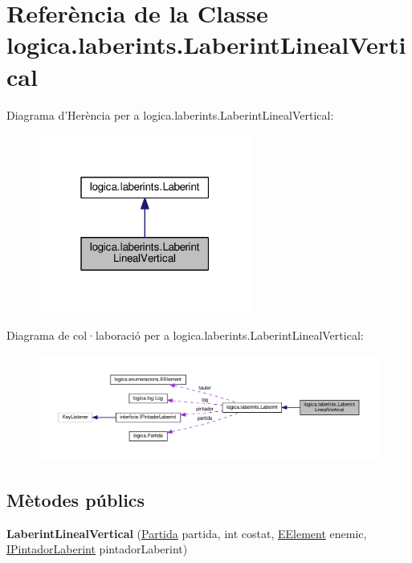 \hypertarget{classlogica_1_1laberints_1_1_laberint_lineal_vertical}{\section{Referència de la Classe logica.\+laberints.\+Laberint\+Lineal\+Vertical}
\label{classlogica_1_1laberints_1_1_laberint_lineal_vertical}
}


Diagrama d'Herència per a logica.\+laberints.\+Laberint\+Lineal\+Vertical\+:\nopagebreak
\begin{figure}[H]
\begin{center}
\leavevmode
\includegraphics[width=199pt]{classlogica_1_1laberints_1_1_laberint_lineal_vertical__inherit__graph}
\end{center}
\end{figure}


Diagrama de col·laboració per a logica.\+laberints.\+Laberint\+Lineal\+Vertical\+:\nopagebreak
\begin{figure}[H]
\begin{center}
\leavevmode
\includegraphics[width=350pt]{classlogica_1_1laberints_1_1_laberint_lineal_vertical__coll__graph}
\end{center}
\end{figure}
\subsection*{Mètodes públics}
\begin{DoxyCompactItemize}
\item 
\hypertarget{classlogica_1_1laberints_1_1_laberint_lineal_vertical_a98a5be8e42c30d6f6ad03e5c1e635c4b}{{\bfseries Laberint\+Lineal\+Vertical} (\hyperlink{classlogica_1_1_partida}{Partida} partida, int costat, \hyperlink{enumlogica_1_1enumeracions_1_1_e_element}{E\+Element} enemic, \hyperlink{interfaceinterficie_1_1_i_pintador_laberint}{I\+Pintador\+Laberint} pintador\+Laberint)}\label{classlogica_1_1laberints_1_1_laberint_lineal_vertical_a98a5be8e42c30d6f6ad03e5c1e635c4b}

\end{DoxyCompactItemize}
